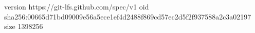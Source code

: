 version https://git-lfs.github.com/spec/v1
oid sha256:00665d71bd09009e56a5ece1ef4d2488f869cd57ec2d5f2f937588a2c3a02197
size 1398256
